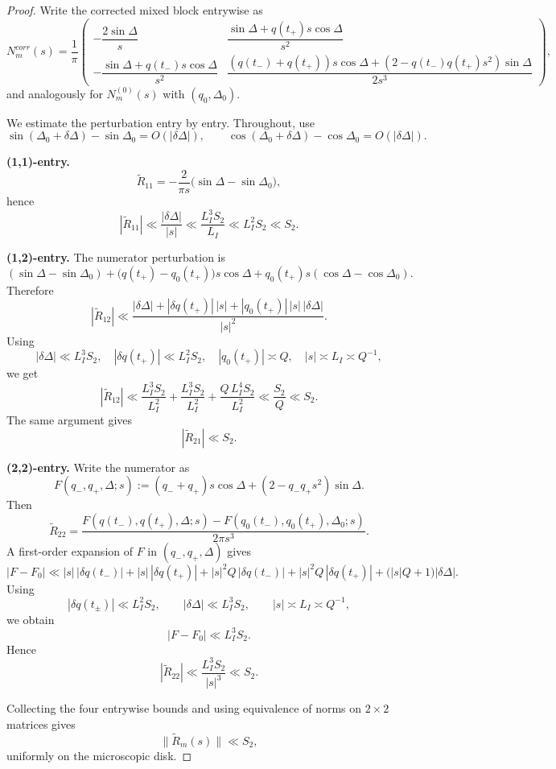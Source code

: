 \documentclass[11pt,a4paper]{amsart}
\def\corr{corr}%
\theoremstyle{plain}
\theoremstyle{definition}
\newcommand{\corr}{\mathrm{corr}}
\begin{document}
\begin{proof}
Write the corrected mixed block entrywise as
\[
N_m^{\corr}(s)=\frac1\pi
\begin{pmatrix}
-\dfrac{2\sin\Delta}{s}
&
\dfrac{\sin\Delta+q(t_+)s\cos\Delta}{s^2}
\\[2ex]
-\dfrac{\sin\Delta+q(t_-)s\cos\Delta}{s^2}
&
\dfrac{(q(t_-)+q(t_+))s\cos\Delta+(2-q(t_-)q(t_+)s^2)\sin\Delta}{2s^3}
\end{pmatrix},
\]
and analogously for $N_m^{(0)}(s)$ with $(q_0,\Delta_0)$.

We estimate the perturbation entry by entry. Throughout, use
\[
\sin(\Delta_0+\delta\Delta)-\sin\Delta_0=O(|\delta\Delta|),
\qquad
\cos(\Delta_0+\delta\Delta)-\cos\Delta_0=O(|\delta\Delta|).
\]

\medskip
\noindent
\textbf{(1,1)-entry.}
\[
\widetilde R_{11}
=
-\frac{2}{\pi s}\bigl(\sin\Delta-\sin\Delta_0\bigr),
\]
hence
\[
|\widetilde R_{11}|
\ll
\frac{|\delta\Delta|}{|s|}
\ll
\frac{L_I^3S_2}{L_I}
\ll
L_I^2S_2
\ll
S_2.
\]

\medskip
\noindent
\textbf{(1,2)-entry.}
The numerator perturbation is
\[
(\sin\Delta-\sin\Delta_0)
+
\bigl(q(t_+)-q_0(t_+)\bigr)s\cos\Delta
+
q_0(t_+)s(\cos\Delta-\cos\Delta_0).
\]
Therefore
\[
|\widetilde R_{12}|
\ll
\frac{|\delta\Delta|+|\delta q(t_+)|\,|s|+|q_0(t_+)|\,|s|\,|\delta\Delta|}{|s|^2}.
\]
Using
\[
|\delta\Delta|\ll L_I^3S_2,\quad
|\delta q(t_+)|\ll L_I^2S_2,\quad
|q_0(t_+)|\asymp Q,\quad
|s|\asymp L_I\asymp Q^{-1},
\]
we get
\[
|\widetilde R_{12}|\ll \frac{L_I^3S_2}{L_I^2}
+\frac{L_I^3S_2}{L_I^2}
+\frac{Q\,L_I^4S_2}{L_I^2}
\ll
\frac{S_2}{Q}
\ll S_2.
\]
The same argument gives
\[
|\widetilde R_{21}|\ll S_2.
\]

\medskip
\noindent
\textbf{(2,2)-entry.}
Write the numerator as
\[
F(q_-,q_+,\Delta;s):=
(q_-+q_+)s\cos\Delta+(2-q_-q_+s^2)\sin\Delta.
\]
Then
\[
\widetilde R_{22}
=
\frac{F(q(t_-),q(t_+),\Delta;s)-F(q_0(t_-),q_0(t_+),\Delta_0;s)}{2\pi s^3}.
\]
A first-order expansion of $F$ in $(q_-,q_+,\Delta)$ gives
\[
|F-F_0|
\ll
|s|\,|\delta q(t_-)|+|s|\,|\delta q(t_+)|
+|s|^2Q\,|\delta q(t_-)|+|s|^2Q\,|\delta q(t_+)|
+\bigl(|s|Q+1\bigr)|\delta\Delta|.
\]
Using
\[
|\delta q(t_\pm)|\ll L_I^2S_2,\qquad
|\delta\Delta|\ll L_I^3S_2,\qquad
|s|\asymp L_I\asymp Q^{-1},
\]
we obtain
\[
|F-F_0|\ll L_I^3S_2.
\]
Hence
\[
|\widetilde R_{22}|
\ll
\frac{L_I^3S_2}{|s|^3}
\ll
S_2.
\]

Collecting the four entrywise bounds and using equivalence of norms on
$2\times2$ matrices gives
\[
\|\widetilde R_m(s)\|\ll S_2,
\]
uniformly on the microscopic disk.
\end{proof}
\end{document}
